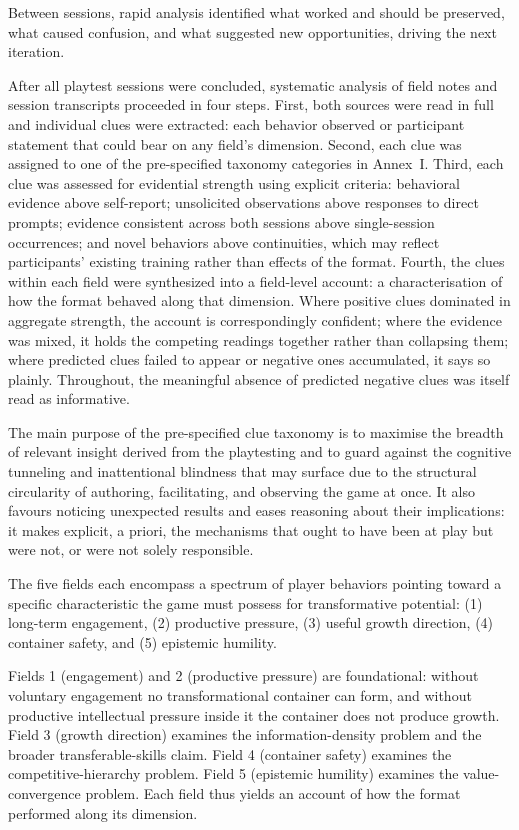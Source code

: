 Between sessions, rapid analysis identified what worked and should be preserved, what caused confusion, and what suggested new opportunities, driving the next iteration.

After all playtest sessions were concluded, systematic analysis of field notes and session transcripts proceeded in four steps. First, both sources were read in full and individual clues were extracted: each behavior observed or participant statement that could bear on any field's dimension. Second, each clue was assigned to one of the pre-specified taxonomy categories in Annex~I. Third, each clue was assessed for evidential strength using explicit criteria: behavioral evidence above self-report; unsolicited observations above responses to direct prompts; evidence consistent across both sessions above single-session occurrences; and novel behaviors above continuities, which may reflect participants' existing training rather than effects of the format. Fourth, the clues within each field were synthesized into a field-level account: a characterisation of how the format behaved along that dimension. Where positive clues dominated in aggregate strength, the account is correspondingly confident; where the evidence was mixed, it holds the competing readings together rather than collapsing them; where predicted clues failed to appear or negative ones accumulated, it says so plainly. Throughout, the meaningful absence of predicted negative clues was itself read as informative.

The main purpose of the pre-specified clue taxonomy is to maximise the breadth of relevant insight derived from the playtesting and to guard against the cognitive tunneling and inattentional blindness that may surface due to the structural circularity of authoring, facilitating, and observing the game at once. It also favours noticing unexpected results and eases reasoning about their implications: it makes explicit, a priori, the mechanisms that ought to have been at play but were not, or were not solely responsible.

The five fields each encompass a spectrum of player behaviors pointing toward a specific characteristic the game must possess for transformative potential: (1) long-term engagement, (2) productive pressure, (3) useful growth direction, (4) container safety, and (5) epistemic humility.

Fields 1 (engagement) and 2 (productive pressure) are foundational: without voluntary engagement no transformational container can form, and without productive intellectual pressure inside it the container does not produce growth. Field 3 (growth direction) examines the information-density problem and the broader transferable-skills claim. Field 4 (container safety) examines the competitive-hierarchy problem. Field 5 (epistemic humility) examines the value-convergence problem. Each field thus yields an account of how the format performed along its dimension.

